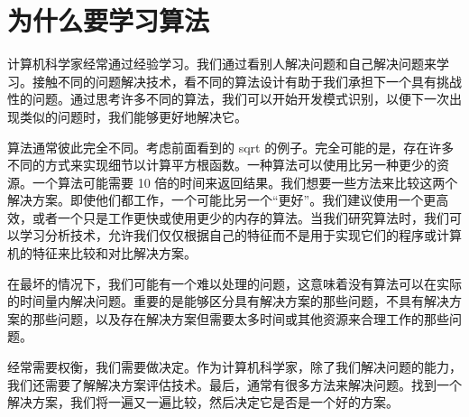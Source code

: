 \section{为什么要学习算法}

计算机科学家经常通过经验学习。我们通过看别人解决问题和自己解决问题来学习。接触不同的问题解决技术，看不同的算法设计有助于我们承担下一个具有挑战性的问题。通过思考许多不同的算法，我们可以开始开发模式识别，以便下一次出现类似的问题时，我们能够更好地解决它。


算法通常彼此完全不同。考虑前面看到的 sqrt 的例子。完全可能的是，存在许多不同的方式来实现细节以计算平方根函数。一种算法可以使用比另一种更少的资源。一个算法可能需要 10 倍的时间来返回结果。我们想要一些方法来比较这两个解决方案。即使他们都工作，一个可能比另一个“更好”。我们建议使用一个更高效，或者一个只是工作更快或使用更少的内存的算法。当我们研究算法时，我们可以学习分析技术，允许我们仅仅根据自己的特征而不是用于实现它们的程序或计算机的特征来比较和对比解决方案。


在最坏的情况下，我们可能有一个难以处理的问题，这意味着没有算法可以在实际的时间量内解决问题。重要的是能够区分具有解决方案的那些问题，不具有解决方案的那些问题，以及存在解决方案但需要太多时间或其他资源来合理工作的那些问题。



经常需要权衡，我们需要做决定。作为计算机科学家，除了我们解决问题的能力，我们还需要了解解决方案评估技术。最后，通常有很多方法来解决问题。找到一个解决方案，我们将一遍又一遍比较，然后决定它是否是一个好的方案。
